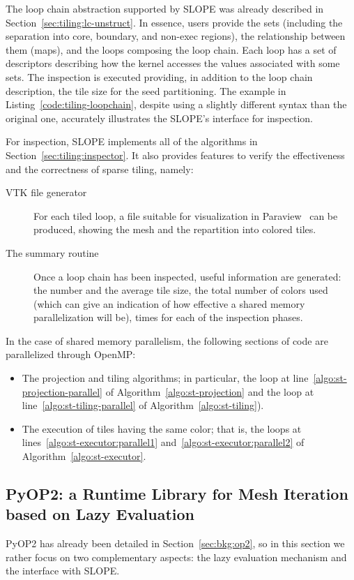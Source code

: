 The loop chain abstraction supported by SLOPE was already described in Section~\ref{sec:tiling:lc-unstruct}. In essence, users provide the sets (including the separation into core, boundary, and non-exec regions), the relationship between them (maps), and the loops composing the loop chain. Each loop has a set of descriptors describing how the kernel accesses the values associated with some sets. The inspection is executed providing, in addition to the loop chain description, the tile size for the seed partitioning. The example in Listing~\ref{code:tiling-loopchain}, despite using a slightly different syntax than the original one, accurately illustrates the SLOPE's interface for inspection.

For inspection, SLOPE implements all of the algorithms in Section~\ref{sec:tiling:inspector}. It also provides features to verify the effectiveness and the correctness of sparse tiling, namely:
\begin{description}
\item[VTK file generator] For each tiled loop, a file suitable for visualization in Paraview~\cite{paraview} can be produced, showing the mesh and the repartition into colored tiles.
\item[The summary routine] Once a loop chain has been inspected, useful information are generated: the number and the average tile size, the total number of colors used (which can give an indication of how effective a shared memory parallelization will be), times for each of the inspection phases. 
\end{description}

In the case of shared memory parallelism, the following sections of code are parallelized through OpenMP:
\begin{itemize}
\item The projection and tiling algorithms; in particular, the loop at line~\ref{algo:st-projection-parallel} of Algorithm~\ref{algo:st-projection} and the loop at line~\ref{algo:st-tiling-parallel} of Algorithm~\ref{algo:st-tiling}).
\item The execution of tiles having the same color; that is, the loops at lines~\ref{algo:st-executor:parallel1} and~\ref{algo:st-executor:parallel2} of Algorithm~\ref{algo:st-executor}.
\end{itemize}


\subsection{PyOP2: a Runtime Library for Mesh Iteration based on Lazy Evaluation}
PyOP2 has already been detailed in Section~\ref{sec:bkg:op2}, so in this section we rather focus on two complementary aspects: the lazy evaluation mechanism and the interface with SLOPE.

